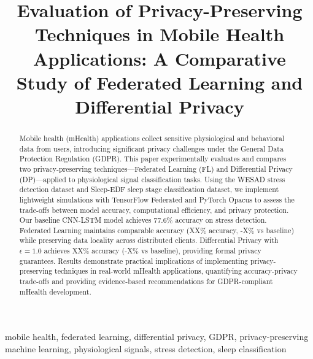 \documentclass[conference]{IEEEtran}
\begin{document}
\title{Evaluation of Privacy-Preserving Techniques in Mobile Health Applications: A Comparative Study of Federated Learning and Differential Privacy}

\author{
}

\maketitle

\begin{abstract}
Mobile health (mHealth) applications collect sensitive physiological and behavioral data from users, introducing significant privacy challenges under the General Data Protection Regulation (GDPR). This paper experimentally evaluates and compares two privacy-preserving techniques—Federated Learning (FL) and Differential Privacy (DP)—applied to physiological signal classification tasks. Using the WESAD stress detection dataset and Sleep-EDF sleep stage classification dataset, we implement lightweight simulations with TensorFlow Federated and PyTorch Opacus to assess the trade-offs between model accuracy, computational efficiency, and privacy protection. Our baseline CNN-LSTM model achieves 77.6\% accuracy on stress detection. Federated Learning maintains comparable accuracy (XX\% accuracy, -X\% vs baseline) while preserving data locality across distributed clients. Differential Privacy with $\epsilon=1.0$ achieves XX\% accuracy (-X\% vs baseline), providing formal privacy guarantees. Results demonstrate practical implications of implementing privacy-preserving techniques in real-world mHealth applications, quantifying accuracy-privacy trade-offs and providing evidence-based recommendations for GDPR-compliant mHealth development.
\end{abstract}

\begin{IEEEkeywords}
mobile health, federated learning, differential privacy, GDPR, privacy-preserving machine learning, physiological signals, stress detection, sleep classification
\end{IEEEkeywords}
\end{document}
